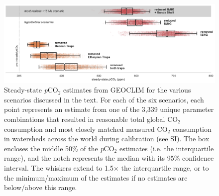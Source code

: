 \documentclass[11pt,letterpaper]{article}
\newcommand{\pCOtwo}{\textit{p}CO$_{2}$\xspace}
\newcommand{\COtwo}{CO$_{2}$\xspace}
\begin{document}
\begin{figure}[h!]
    \centering
    \includegraphics[width=1\textwidth]{Figures/scenario_pCO2.pdf}
    \caption{Steady-state \pCOtwo estimates from GEOCLIM for the various scenarios discussed in the text. For each of the six scenarios, each point represents an estimate from one of the 3,339 unique parameter combinations that resulted in reasonable total global \COtwo consumption and most closely matched measured \COtwo consumption in watersheds across the world during calibration (see SI). The box encloses the middle 50\% of the \pCOtwo estimates (i.e. the interquartile range), and the notch represents the median with its 95\% confidence interval. The whiskers extend to 1.5$\times$ the interquartile range, or to the minimum/maximum of the estimates if no estimates are below/above this range.}
    \label{fig:scenario_pCO2}
\end{figure}

\clearpage
\newpage
\footnotesize

\singlespacing



\end{document}
